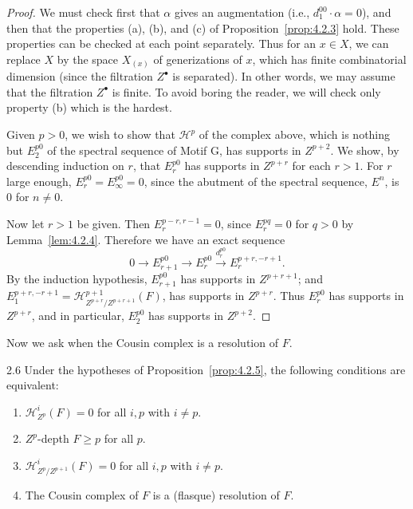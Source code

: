 \begin{proof}
We must check first that $\alpha$ gives an augmentation (i.e., $d_1^{00}\cdot\alpha=0$), and then that the properties (a), (b), and (c) of Proposition~\ref{prop:4.2.3} hold. These properties can be checked at each point separately. Thus for an $x\in X$, we can replace $X$ by the space $X_{(x)}$ of generizations of $x$, which has finite combinatorial dimension (since the filtration $Z^\bullet$ is separated). In other words, we may assume that the filtration $Z^\bullet$ is finite. To avoid boring the reader, we will check only property (b) which is the hardest.

Given $p>0$, we wish to show that $\mathcal{H}^p$ of the complex above, which is nothing but $E_2^{p0}$ of the spectral sequence of Motif G, has supports in $Z^{p+2}$. We show, by descending induction on $r$, that $E_r^{p0}$ has supports in $Z^{p+r}$ for each $r>1$. For $r$ large enough, $E_r^{p0}=E_{\infty}^{p0}=0$, since the abutment of the spectral sequence, $E^n$, is $0$ for $n\neq 0$.

Now let $r>1$ be given. Then $E_r^{p-r,r-1}=0$, since $E_r^{pq}=0$ for $q>0$ by Lemma~\ref{lem:4.2.4}. Therefore we have an exact sequence
\[
0\longrightarrow E_{r+1}^{p0}\longrightarrow E_r^{p0}\xrightarrow{d_r^{p0}} E_r^{p+r,-r+1}.
\]
By the induction hypothesis, $E_{r+1}^{p0}$ has supports in $Z^{p+r+1}$; and $E_1^{p+r,-r+1}= \mathcal{H}_{Z^{p+r}/Z^{p+r+1}}^{p+1}(F)$, has supports in $Z^{p+r}$. Thus $E_r^{p0}$ has supports in $Z^{p+r}$, and in particular, $E_2^{p0}$ has supports in $Z^{p+2}$.
\end{proof}

Now we ask when the Cousin complex is a resolution of $F$.

\begin{bookproposition}{2.6}\label{prop:4.2.6}
Under the hypotheses of Proposition~\ref{prop:4.2.5}, the following conditions are equivalent:
\begin{enumerate}
\item[(i)] $\mathcal{H}_{Z^p}^{i}(F)=0$ for all $i,p$ with $i\neq p$.
\item[(ii)] $Z^{p}$-depth $F\geq p$ for all $p$.
\item[(iii)] $\mathcal{H}_{Z^{p}/Z^{p+1}}^{i}(F)=0$ for all $i,p$ with $i\neq p$.
\item[(iv)] The Cousin complex of $F$ is a (flasque) resolution of $F$.
\end{enumerate}
\end{bookproposition}

